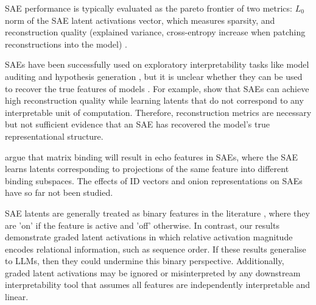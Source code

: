 
SAE performance is typically evaluated as the pareto frontier of two metrics: $L_0$ norm of the SAE latent activations vector, which measures sparsity, and reconstruction quality (explained variance, cross-entropy increase when patching reconstructions into the model) \citep{karvonen2025saebench,ferrando2024primer,towardsmonosemanticity}.

SAEs have been successfully used on exploratory interpretability tasks like model auditing \citep{marks2025auditing} and hypothesis generation \citep{movva2025sparse}, but it is unclear whether they can be used to recover the true features of models \citep{leask2025sparse, chanin2024absorption}.
For example, \citet{leask2025sparse} show that SAEs can achieve high reconstruction quality while learning latents that do not correspond to any interpretable unit of computation.
Therefore, reconstruction metrics are necessary but not sufficient evidence that an SAE has recovered the model's true representational structure.

\citet{wattenberg2024relational} argue that matrix binding will result in echo features in SAEs, where the SAE learns latents corresponding to projections of the same feature into different binding subspaces. The effects of ID vectors and onion representations on SAEs have so far not been studied. 

SAE latents are generally treated as binary features in the literature \citep{paulo2024automatically, quirke2025binary}, where they are 'on' if the feature is active and 'off' otherwise. In contrast, our results demonstrate graded latent activations in which relative activation magnitude encodes relational information, such as sequence order. If these results generalise to LLMs, then they could undermine this binary perspective. Additionally, graded latent activations may be ignored or misinterpreted by any downstream interpretability tool that assumes all features are independently interpretable and linear.
